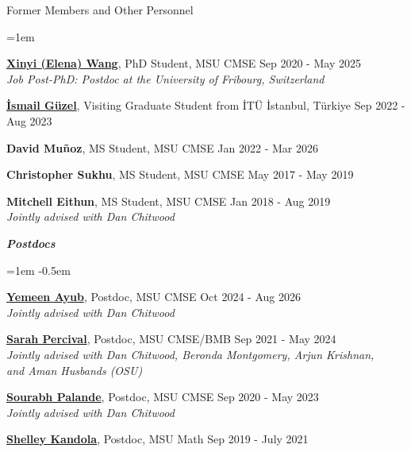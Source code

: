 \documentclass{resume} %
\begin{document}
\begin{rSection}{Former Members and Other Personnel}
\begin{list}{}{\leftmargin=1em}
   \item \textbf{\href{https://elenaxwang.com/}{Xinyi (Elena) Wang}}, PhD Student, MSU CMSE \hfill Sep 2020 - May 2025\\ 
   \phantom{XXX} \textit{Job Post-PhD:  Postdoc at the University of Fribourg, Switzerland}
      

   \item \textbf{\href{https://ismailguzel.github.io/}{\.{I}smail G\"{u}zel}}, Visiting Graduate Student from  İTÜ İstanbul, Türkiye \hfill Sep 2022 - Aug 2023

   \item \textbf{David Muñoz}, MS Student, MSU CMSE \hfill Jan 2022 - Mar 2026

   \item \textbf{Christopher Sukhu}, MS Student, MSU CMSE \hfill May 2017 - May 2019

   \item \textbf{Mitchell Eithun}, MS Student, MSU CMSE \hfill Jan 2018 - Aug 2019
\\
   \phantom{XXX} \textit{Jointly advised with Dan Chitwood}
\end{list}

   \textbf{\textit{Postdocs}}
   \begin{list}{}{\leftmargin=1em}
      \itemsep -0.5em 
      \item 
   \item \textbf{\href{https://yemeen.com/}{Yemeen Ayub}}, Postdoc, MSU CMSE \hfill Oct 2024 - Aug 2026\\ 
   \phantom{XXX}\textit{Jointly advised with Dan Chitwood}
   \item \textbf{\href{https://www.math.unm.edu/~sarah/}{Sarah Percival}}, Postdoc, MSU CMSE/BMB \hfill Sep 2021 - May 2024\\
   \phantom{XXX} \textit{Jointly advised with Dan Chitwood, Beronda Montgomery, Arjun Krishnan,}\\
   \phantom{XXX} \textit{and Aman Husbands (OSU)}

   \item \textbf{\href{http://sci.utah.edu/~sourabh/}{Sourabh Palande}}, Postdoc, MSU CMSE \hfill Sep 2020 - May 2023\\
   \phantom{XXX} \textit{Jointly advised with Dan Chitwood}

   \item \textbf{\href{www.shelleykandola.com}{Shelley Kandola}}, Postdoc, MSU Math \hfill Sep 2019 - July 2021


\end{list}
\end{rSection}
\end{document}
